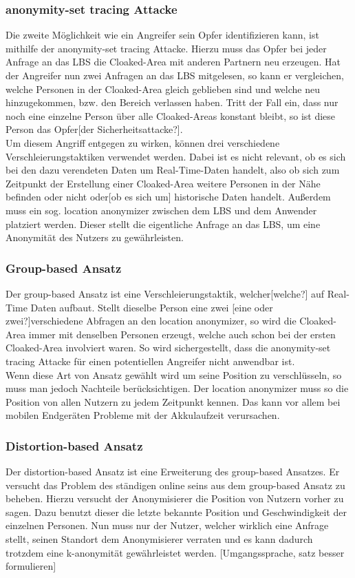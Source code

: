 \subsubsection{anonymity-set tracing Attacke} 
Die zweite Möglichkeit wie ein Angreifer sein Opfer identifizieren kann, ist mithilfe der anonymity-set tracing Attacke. Hierzu muss das Opfer bei jeder Anfrage an das LBS die Cloaked-Area mit anderen Partnern neu erzeugen. Hat der Angreifer nun zwei Anfragen an das LBS mitgelesen, so kann er vergleichen, welche Personen in der Cloaked-Area gleich geblieben sind und welche neu hinzugekommen, bzw. den Bereich verlassen haben. Tritt der Fall ein, dass nur noch eine einzelne Person über alle Cloaked-Areas konstant bleibt, so ist diese Person das Opfer[der Sicherheitsattacke?].\\ Um diesem Angriff entgegen zu wirken, können drei verschiedene Verschleierungstaktiken verwendet werden. Dabei ist es nicht relevant, ob es sich bei den dazu verendeten Daten um Real-Time-Daten handelt, also ob sich zum Zeitpunkt der Erstellung einer Cloaked-Area weitere Personen in der Nähe befinden oder nicht oder[ob es sich um] historische Daten handelt. Außerdem muss ein sog. location anonymizer zwischen dem LBS und dem Anwender platziert werden. Dieser stellt die eigentliche Anfrage an das LBS, um eine Anonymität des Nutzers zu gewährleisten. 
\subsubsection{Group-based Ansatz} 
Der group-based Ansatz ist eine Verschleierungstaktik, welcher[welche?] auf Real-Time Daten aufbaut. Stellt dieselbe Person eine zwei [eine oder zwei?]verschiedene Abfragen an den location anonymizer, so wird die Cloaked-Area immer mit denselben Personen erzeugt, welche auch schon bei der ersten Cloaked-Area involviert waren. So wird sichergestellt, dass die anonymity-set tracing Attacke für einen potentiellen Angreifer nicht anwendbar ist.\\Wenn diese Art von Ansatz gewählt wird um seine Position zu verschlüsseln, so muss man jedoch Nachteile berücksichtigen. Der location anonymizer muss so die Position von allen Nutzern zu jedem Zeitpunkt kennen. Das kann vor allem bei mobilen Endgeräten Probleme mit der Akkulaufzeit verursachen.  
\subsubsection{Distortion-based Ansatz} 
Der distortion-based Ansatz ist eine Erweiterung des group-based Ansatzes. Er versucht das Problem des ständigen online seins aus dem group-based Ansatz zu beheben. Hierzu versucht der Anonymisierer die Position von Nutzern vorher zu sagen. Dazu benutzt dieser die letzte bekannte Position und Geschwindigkeit der einzelnen Personen. Nun muss nur der Nutzer, welcher wirklich eine Anfrage stellt, seinen Standort dem Anonymisierer verraten und es kann dadurch trotzdem eine k-anonymität gewährleistet werden. [Umgangssprache, satz besser formulieren] 
